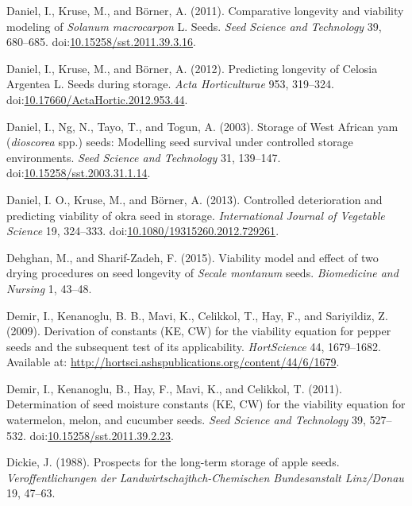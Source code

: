 \documentclass[]{article}
\begin{document}
\leavevmode\hypertarget{ref-daniel_comparative_2011}{}%
Daniel, I., Kruse, M., and Börner, A. (2011). Comparative longevity and
viability modeling of \emph{Solanum macrocarpon} L. Seeds. \emph{Seed
Science and Technology} 39, 680--685.
doi:\href{https://doi.org/10.15258/sst.2011.39.3.16}{10.15258/sst.2011.39.3.16}.

\leavevmode\hypertarget{ref-daniel_predicting_2012}{}%
Daniel, I., Kruse, M., and Börner, A. (2012). Predicting longevity of
Celosia Argentea L. Seeds during storage. \emph{Acta Horticulturae} 953,
319--324.
doi:\href{https://doi.org/10.17660/ActaHortic.2012.953.44}{10.17660/ActaHortic.2012.953.44}.

\leavevmode\hypertarget{ref-daniel_storage_2003}{}%
Daniel, I., Ng, N., Tayo, T., and Togun, A. (2003). Storage of West
African yam (\emph{dioscorea} spp.) seeds: Modelling seed survival under
controlled storage environments. \emph{Seed Science and Technology} 31,
139--147.
doi:\href{https://doi.org/10.15258/sst.2003.31.1.14}{10.15258/sst.2003.31.1.14}.

\leavevmode\hypertarget{ref-daniel_controlled_2013}{}%
Daniel, I. O., Kruse, M., and Börner, A. (2013). Controlled
deterioration and predicting viability of okra seed in storage.
\emph{International Journal of Vegetable Science} 19, 324--333.
doi:\href{https://doi.org/10.1080/19315260.2012.729261}{10.1080/19315260.2012.729261}.

\leavevmode\hypertarget{ref-dehghan_viability_2015}{}%
Dehghan, M., and Sharif-Zadeh, F. (2015). Viability model and effect of
two drying procedures on seed longevity of \emph{Secale montanum} seeds.
\emph{Biomedicine and Nursing} 1, 43--48.

\leavevmode\hypertarget{ref-demir_derivation_2009}{}%
Demir, I., Kenanoglu, B. B., Mavi, K., Celikkol, T., Hay, F., and
Sariyildiz, Z. (2009). Derivation of constants (KE, CW) for the
viability equation for pepper seeds and the subsequent test of its
applicability. \emph{HortScience} 44, 1679--1682. Available at:
\url{http://hortsci.ashspublications.org/content/44/6/1679}.

\leavevmode\hypertarget{ref-demir_determination_2011}{}%
Demir, I., Kenanoglu, B., Hay, F., Mavi, K., and Celikkol, T. (2011).
Determination of seed moisture constants (KE, CW) for the viability
equation for watermelon, melon, and cucumber seeds. \emph{Seed Science
and Technology} 39, 527--532.
doi:\href{https://doi.org/10.15258/sst.2011.39.2.23}{10.15258/sst.2011.39.2.23}.

\leavevmode\hypertarget{ref-dickie_prospects_1988}{}%
Dickie, J. (1988). Prospects for the long-term storage of apple seeds.
\emph{Veroffentlichungen der Landwirtschajthch-Chemischen Bundesanstalt
Linz/Donau} 19, 47--63.
\end{document}
